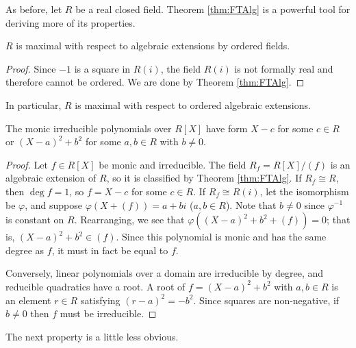As before, let $R$ be a real closed field. Theorem \ref{thm:FTAlg} is a powerful tool for deriving more of its properties.

\begin{lemma}
  \label{lem:RCF_max}
  $R$ is maximal with respect to algebraic extensions by ordered fields.
\end{lemma}
\begin{proof}
  Since $-1$ is a square in $R(i)$, the field $R(i)$ is not formally real and therefore cannot be ordered. We are done by Theorem \ref{thm:FTAlg}.
\end{proof}

In particular, $R$ is maximal with respect to ordered algebraic extensions.

\begin{lemma}
  \label{lem:irreds_class}
  The monic irreducible polynomials over $R[X]$ have form $X-c$ for some $c\in R$ or $(X-a)^2+b^2$ for some $a,b\in R$ with $b\neq0$.
\end{lemma}
\begin{proof}
  Let $f\in R[X]$ be monic and irreducible. The field $R_f=R[X]/(f)$ is an algebraic extension of $R$, so it is classified by Theorem \ref{thm:FTAlg}. If $R_f\cong R$, then $\deg f=1$, so $f=X-c$ for some $c\in R$. If $R_f\cong R(i)$, let the isomorphism be $\varphi$, and suppose $\varphi(X+(f))=a+bi$ ($a,b\in R$). Note that $b\neq0$ since $\varphi^{-1}$ is constant on $R$. Rearranging, we see that $\varphi((X-a)^2+b^2+(f))=0$; that is, $(X-a)^2+b^2\in(f)$. Since this polynomial is monic and has the same degree as $f$, it must in fact be equal to $f$.

  Conversely, linear polynomials over a domain are irreducible by degree, and reducible quadratics have a root. A root of $f=(X-a)^2+b^2$ with $a,b\in R$ is an element $r\in R$ satisfying $(r-a)^2=-b^2$. Since squares are non-negative, if $b\neq0$ then $f$ must be irreducible.
\end{proof}

The next property is a little less obvious.

